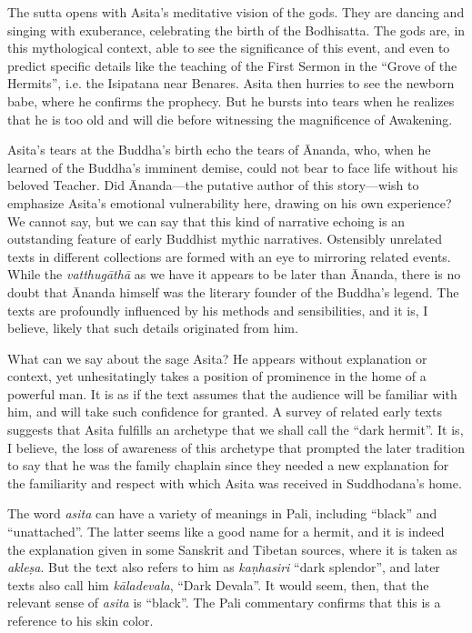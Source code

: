 \documentclass[12pt,openany]{book}%
\begin{document}
The sutta opens with Asita’s meditative vision of the gods. They are dancing and singing with exuberance, celebrating the birth of the Bodhisatta. The gods are, in this mythological context, able to see the significance of this event, and even to predict specific details like the teaching of the First Sermon in the “Grove of the Hermits”, i.e. the Isipatana near Benares. Asita then hurries to see the newborn babe, where he confirms the prophecy. But he bursts into tears when he realizes that he is too old and will die before witnessing the magnificence of Awakening.

Asita’s tears at the Buddha’s birth echo the tears of Ānanda, who, when he learned of the Buddha’s imminent demise, could not bear to face life without his beloved Teacher. Did Ānanda—the putative author of this story—wish to emphasize Asita’s emotional vulnerability here, drawing on his own experience? We cannot say, but we can say that this kind of narrative echoing is an outstanding feature of early Buddhist mythic narratives. Ostensibly unrelated texts in different collections are formed with an eye to mirroring related events. While the \textit{\textsanskrit{vatthugāthā}} as we have it appears to be later than Ānanda, there is no doubt that Ānanda himself was the literary founder of the Buddha’s legend. The texts are profoundly influenced by his methods and sensibilities, and it is, I believe, likely that such details originated from him.

What can we say about the sage Asita? He appears without explanation or context, yet unhesitatingly takes a position of prominence in the home of a powerful man. It is as if the text assumes that the audience will be familiar with him, and will take such confidence for granted. A survey of related early texts suggests that Asita fulfills an archetype that we shall call the “dark hermit”. It is, I believe, the loss of awareness of this archetype that prompted the later tradition to say that he was the family chaplain since they needed a new explanation for the familiarity and respect with which Asita was received in Suddhodana’s home.

The word \textit{asita} can have a variety of meanings in Pali, including “black” and “unattached”. The latter seems like a good name for a hermit, and it is indeed the explanation given in some Sanskrit and Tibetan sources, where it is taken as \textit{\textsanskrit{akleṣa}}. But the text also refers to him as \textit{\textsanskrit{kaṇhasiri}} “dark splendor”, and later texts also call him \textit{\textsanskrit{kāladevala}}, “Dark Devala”. It would seem, then, that the relevant sense of \textit{asita} is “black”. The Pali commentary confirms that this is a reference to his skin color.
\end{document}
